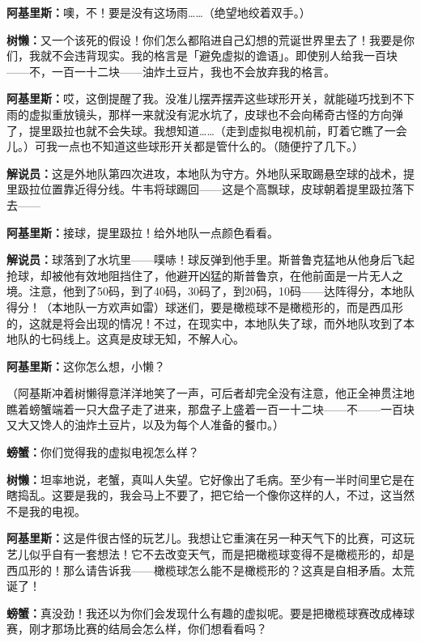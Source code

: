 \documentclass[
  12pt,
  twoside,
  openright,
  oldfontcommands,
]{memoir}
\newcommand{\kaitismall}[1]{{\kaitifamily\small #1}}
\newcommand{\dialogname}[1]{{\heifamily\bfseries #1}}
\begin{document}
\dialogname{阿基里斯：}噢，不！要是没有这场雨\ldots\ldots{}\kaitismall{（绝望地绞着双手。）}

\dialogname{树懒：}又一个该死的假设！你们怎么都陷进自己幻想的荒诞世界里去了！我要是你们，我就不会违背现实。我的格言是「避免虚拟的谵语」。即使别人给我一百块------不，一百一十二块------油炸土豆片，我也不会放弃我的格言。

\dialogname{阿基里斯：}哎，这倒提醒了我。没准儿摆弄摆弄这些球形开关，就能碰巧找到不下雨的虚拟重放镜头，那样一来就没有泥水坑了，皮球也不会向稀奇古怪的方向弹了，提里趿拉也就不会失球。我想知道\ldots\ldots{}\kaitismall{（走到虚拟电视机前，盯着它瞧了一会儿。）}可我一点也不知道这些球形开关都是管什么的。\kaitismall{（随便拧了几下。）}

\dialogname{解说员：}这是外地队第四次进攻，本地队为守方。外地队采取踢悬空球的战术，提里趿拉位置靠近得分线。牛韦将球踢回------这是个高飘球，皮球朝着提里趿拉落下去------

\dialogname{阿基里斯：}接球，提里趿拉！给外地队一点颜色看看。

\dialogname{解说员：}球落到了水坑里------噗哧！球反弹到他手里。斯普鲁克猛地从他身后飞起抢球，却被他有效地阻挡住了，他避开凶猛的斯普鲁京，在他前面是一片无人之境。注意，他到了50码，到了40码，30码了，到20码，10码------达阵得分，本地队得分！\kaitismall{（本地队一方欢声如雷）}球迷们，要是橄榄球不是橄榄形的，而是西瓜形的，这就是将会出现的情况！不过，在现实中，本地队失了球，而外地队攻到了本地队的七码线上。这真是皮球无知，不解人心。

\dialogname{阿基里斯：}这你怎么想，小懒？

（阿基斯冲着树懒得意洋洋地笑了一声，可后者却完全没有注意，他正全神贯注地瞧着螃蟹端着一只大盘子走了进来，那盘子上盛着一百一十二块------不------一百块又大又馋人的油炸土豆片，以及为每个人准备的餐巾。）

\dialogname{螃蟹：}你们觉得我的虚拟电视怎么样？

\dialogname{树懒：}坦率地说，老蟹，真叫人失望。它好像出了毛病。至少有一半时间里它是在瞎捣乱。这要是我的，我会马上不要了，把它给一个像你这样的人，不过，这当然不是我的电视。

\dialogname{阿基里斯：}这是件很古怪的玩艺儿。我想让它重演在另一种天气下的比赛，可这玩艺儿似乎自有一套想法！它不去改变天气，而是把橄榄球变得不是橄榄形的，却是西瓜形的！那么请告诉我------橄榄球怎么能不是橄榄形的？这真是自相矛盾。太荒诞了！

\dialogname{螃蟹：}真没劲！我还以为你们会发现什么有趣的虚拟呢。要是把橄榄球赛改成棒球赛，刚才那场比赛的结局会怎么样，你们想看看吗？
\end{document}
